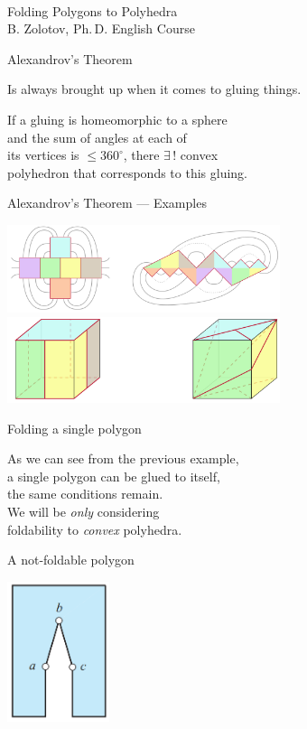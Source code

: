 \documentclass[17pt]{extarticle}
\newcommand{\newslide}[1]{\newpage \begin{center} \large #1
                          \end{center} \vspace{-5.5mm}}
\begin{document}
\ \\ [1cm]

\begin{center} {\Large Folding Polygons to Polyhedra} \bigskip \\
	{\large B. Zolotov, Ph.\,D. English Course} \end{center}

\newslide{Alexandrov's Theorem}

Is always brought up when it comes to gluing things. \medskip

If a gluing is homeomorphic to a sphere \\
and the sum of angles at each of \\
its vertices is $\le 360^\circ$\!, there $\exists\,!$ convex \\
polyhedron that corresponds to this gluing.

\newslide{Alexandrov's Theorem — Examples}

\begin{center}
	\includegraphics[width=0.6\textwidth]{minilec/alex-bef} \medskip \\
	\includegraphics[width=0.6\textwidth]{minilec/alex-zaft}
\end{center}

\newslide{Folding a single polygon}

As we can see from the previous example, \\
a single polygon can be glued to itself, \\
the same conditions remain. \medskip \\
We will be {\it only} considering \\
foldability to {\it convex} polyhedra.

\newslide{A not-foldable polygon}

\begin{center}
	\includegraphics[width=3cm]{minilec/notf}
\end{center} \vspace{-5mm}
\end{document}
